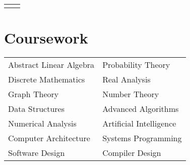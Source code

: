 \documentclass[10pt, oneside, openany]{article} %
\begin{document}
\begin{paracol}{2}
\begin{supertabular}{ll}
	
	
\end{supertabular}


\section{Coursework}

\begin{tabular}{l l}
Abstract Linear Algebra & Probability Theory\\
Discrete Mathematics & Real Analysis\\
Graph Theory & Number Theory\\
Data Structures & Advanced Algorithms\\
Numerical Analysis & Artificial Intelligence\\
Computer Architecture & Systems Programming\\
Software Design & Compiler Design\\
\end{tabular}










\end{paracol}
\end{document}
